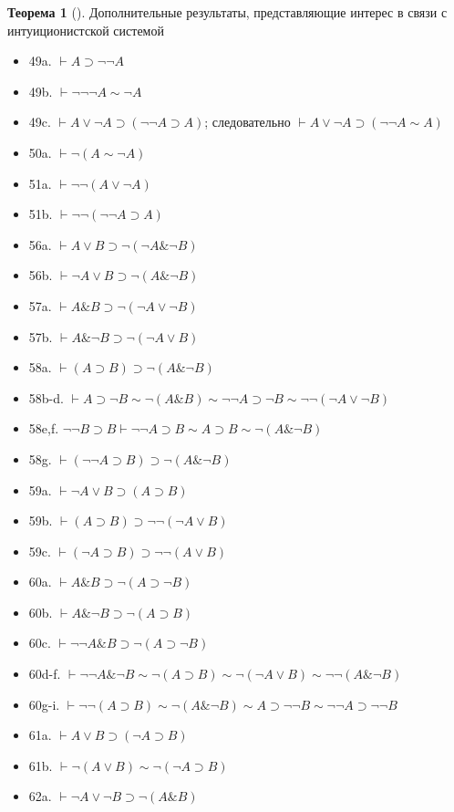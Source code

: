 \documentclass[a4paper, 12pt]{article}  %
\DeclareMathOperator{\conj}{\mathbb{\&}}
\theoremstyle{definition}
\newtheorem{theorem}{Теорема}
\begin{document}
\begin{theorem}[]
		Дополнительные результаты, представляющие интерес в связи с интуиционистской системой
		\begin{itemize}[label={}]
			\setlength\itemsep{0pt}	
			\item 49a. $\vdash A \supset \neg \neg A$		
			\item 49b. $\vdash \neg \neg \neg A \sim \neg A$		
			\item 49c. $\vdash A \vee \neg A \supset (\neg \neg A \supset A)$; следовательно $ \vdash A \vee \neg A \supset (\neg \neg A \sim A)$		
			\item 50a. $\vdash \neg (A \sim \neg A)$		
			\item 51a. $\vdash \neg \neg (A \vee \neg A)$		
			\item 51b. $\vdash \neg \neg (\neg \neg A \supset A)$				
			\item 56a. $\vdash A \vee B \supset \neg (\neg A \conj \neg B)$
			\item 56b. $\vdash \neg A \vee B \supset \neg (A \conj \neg B)$		
			\item 57a. $\vdash A \conj B \supset \neg (\neg A \vee \neg B)$				
			\item 57b. $\vdash A \conj \neg B \supset \neg (\neg A \vee B)$	
			\item 58a. $\vdash (A \supset B) \supset \neg (A \conj \neg B)$		
			\item 58b-d. $\vdash A \supset \neg B \sim \neg (A \conj B) \sim \neg \neg A \supset \neg B \sim \neg \neg (\neg A \vee \neg B)$			
			\item 58e,f. $\neg \neg B \supset B \vdash \neg \neg A \supset B \sim A \supset B \sim \neg (A \conj \neg B)$			
			\item 58g. $\vdash (\neg \neg A \supset B) \supset \neg (A \conj \neg B)$			
			\item 59a. $\vdash \neg A \vee B \supset (A \supset B)$				
			\item 59b. $\vdash (A \supset B) \supset \neg \neg (\neg A \vee B)$			
			\item 59c. $\vdash (\neg A \supset B) \supset \neg \neg (A \vee B)$			
			\item 60a. $\vdash A \conj B \supset \neg (A \supset \neg B)$			
			\item 60b. $\vdash A \conj \neg B \supset \neg (A \supset B)$		
			\item 60c. $\vdash \neg \neg A \conj B \supset \neg (A \supset \neg B)$				
			\item 60d-f. $\vdash \neg \neg A \conj \neg B \sim \neg (A \supset B) \sim \neg (\neg A \vee B) \sim \neg \neg (A \conj \neg B)$
			\item 60g-i. $\vdash \neg \neg (A \supset B) \sim \neg (A \conj \neg B) \sim A \supset \neg \neg B \sim \neg \neg A \supset \neg \neg B$
			\item 61a. $\vdash A \vee B \supset (\neg A \supset B)$
			\item 61b. $\vdash \neg (A \vee B) \sim \neg (\neg A \supset B)$
			\item 62a. $\vdash \neg A \vee \neg B \supset \neg (A \conj B)$		
		\end{itemize}
	\end{theorem}
\end{document}
